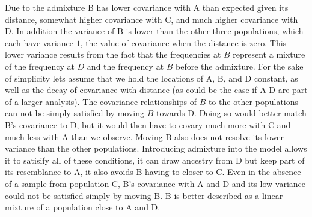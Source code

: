 \documentclass[12pt]{article}
\begin{document}
Due to the admixture B has lower covariance with A than expected given its distance, somewhat higher covariance with C, and much higher covariance with D. In addition the variance of B is lower than the other three populations, which each have variance $1$, the value of covariance when the distance is zero. This lower variance results from the fact that the frequencies at $B$ represent a mixture of the frequency at $D$ and the frequency at $B$ before the admixture. For the sake of simplicity lets assume that we hold the locations of A, B, and D constant, as well as the decay of covariance with distance (as could be the case if A-D are part of a larger analysis).  The covariance relationships of $B$ to the other populations can not be simply satisfied by moving $B$ towards D. Doing so would better match B's covariance to D, but it would then have to covary much more with C and much less with A than we observe. Moving B also does not resolve its lower variance than the other populations. Introducing admixture into the model allows it to satisify all of these conditions, it can draw ancestry from D but keep part of its resemblance to A, it also avoids B having to closer to C. Even in the absence of a sample from population C, B's covariance with A and D and its low variance could not be satisfied simply by moving B. B is better described as a linear mixture of a population close to A and D.



 
 

 
\end{document}
